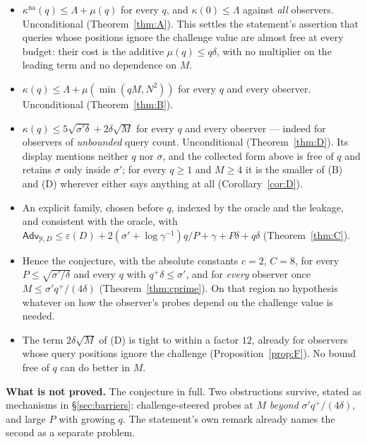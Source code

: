 \documentclass{aicr-solution}
\newcommand{\Adv}{\mathsf{Adv}}
\newcommand{\kna}{\kappa^{\mathrm{na}}}
\begin{document}
\begin{itemize}
\item[(A)] $\kna(q)\le\Lambda+\mu(q)$ for every $q$, and $\kappa(0)\le\Lambda$
  against \emph{all} observers. Unconditional (Theorem~\ref{thm:A}). This settles
  the statement's assertion that queries whose positions ignore the challenge
  value are almost free at every budget: their cost is the additive
  $\mu(q)\le q\delta$, with no multiplier on the leading term and no dependence
  on $M$.
\item[(B)] $\kappa(q)\le\Lambda+\mu(\min(qM,N^{2}))$ for every $q$ and every
  observer. Unconditional (Theorem~\ref{thm:B}).
\item[(D)] $\kappa(q)\le5\sqrt{\sigma'\delta}+2\delta\sqrt M$ for every $q$ and
  every observer --- indeed for observers of \emph{unbounded} query count.
  Unconditional (Theorem~\ref{thm:D}). Its display mentions neither $q$ nor
  $\sigma$, and the collected form above is free of $q$ and retains $\sigma$ only
  inside $\sigma'$; for every $q\ge1$ and $M\ge4$ it is the smaller of (B) and (D)
  wherever either says anything at all (Corollary~\ref{cor:D}).
\item[(C)] An explicit family, chosen before $q$, indexed by the oracle and the
  leakage, and consistent with the oracle, with
  $\Adv_{\mathcal Y,D}\le\varepsilon(D)+2(\sigma'+\log\gamma^{-1})q/P+\gamma+P\delta+q\delta$
  (Theorem~\ref{thm:C}).
\item[(E)] Hence the conjecture, with the absolute constants $c=2$, $C=8$, for
  every $P\le\sqrt{\sigma'/\delta}$ and every $q$ with $q^{+}\delta\le\sigma'$,
  and for \emph{every} observer once $M\le\sigma'q^{+}/(4\delta)$
  (Theorem~\ref{thm:cprime}). On that region no hypothesis whatever on how the
  observer's probes depend on the challenge value is needed.
\item[(F)] The term $2\delta\sqrt M$ of (D) is tight to within a factor $12$,
  already for observers whose query positions ignore the challenge
  (Proposition~\ref{prop:F}). No bound free of $q$ can do better in $M$.
\end{itemize}

\noindent\textbf{What is not proved.} The conjecture in full. Two obstructions
survive, stated as mechanisms in \S\ref{sec:barriers}: challenge-steered probes
at $M$ \emph{beyond} $\sigma'q^{+}/(4\delta)$, and large $P$ with growing $q$. The
statement's own remark already names the second as a separate problem.

\medskip
\end{document}

